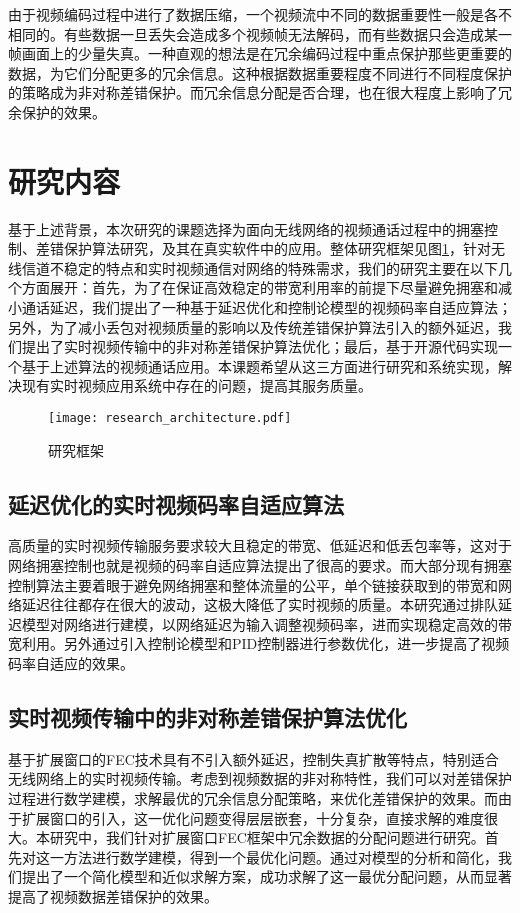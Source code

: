 由于视频编码过程中进行了数据压缩，一个视频流中不同的数据重要性一般是各不相同的。有些数据一旦丢失会造成多个视频帧无法解码，而有些数据只会造成某一帧画面上的少量失真。一种直观的想法是在冗余编码过程中重点保护那些更重要的数据，为它们分配更多的冗余信息。这种根据数据重要程度不同进行不同程度保护的策略成为非对称差错保护。而冗余信息分配是否合理，也在很大程度上影响了冗余保护的效果。


\section{研究内容}
基于上述背景，本次研究的课题选择为面向无线网络的视频通话过程中的拥塞控制、差错保护算法研究，及其在真实软件中的应用。整体研究框架见图\ref{fig:research_architecture}，针对无线信道不稳定的特点和实时视频通信对网络的特殊需求，我们的研究主要在以下几个方面展开：首先，为了在保证高效稳定的带宽利用率的前提下尽量避免拥塞和减小通话延迟，我们提出了一种基于延迟优化和控制论模型的视频码率自适应算法；另外，为了减小丢包对视频质量的影响以及传统差错保护算法引入的额外延迟，我们提出了实时视频传输中的非对称差错保护算法优化；最后，基于开源代码实现一个基于上述算法的视频通话应用。本课题希望从这三方面进行研究和系统实现，解决现有实时视频应用系统中存在的问题，提高其服务质量。

\begin{figure}[htbp]
  \centering
  \texttt{[image: research\_architecture.pdf]}
  \caption{研究框架}
  \label{fig:research_architecture}
\end{figure}


\subsection{延迟优化的实时视频码率自适应算法}
高质量的实时视频传输服务要求较大且稳定的带宽、低延迟和低丢包率等，这对于网络拥塞控制也就是视频的码率自适应算法提出了很高的要求。而大部分现有拥塞控制算法主要着眼于避免网络拥塞和整体流量的公平，单个链接获取到的带宽和网络延迟往往都存在很大的波动，这极大降低了实时视频的质量。本研究通过排队延迟模型对网络进行建模，以网络延迟为输入调整视频码率，进而实现稳定高效的带宽利用。另外通过引入控制论模型和PID控制器进行参数优化，进一步提高了视频码率自适应的效果。

\subsection{实时视频传输中的非对称差错保护算法优化}
基于扩展窗口的FEC技术具有不引入额外延迟，控制失真扩散等特点，特别适合无线网络上的实时视频传输。考虑到视频数据的非对称特性，我们可以对差错保护过程进行数学建模，求解最优的冗余信息分配策略，来优化差错保护的效果。而由于扩展窗口的引入，这一优化问题变得层层嵌套，十分复杂，直接求解的难度很大。本研究中，我们针对扩展窗口FEC框架中冗余数据的分配问题进行研究。首先对这一方法进行数学建模，得到一个最优化问题。通过对模型的分析和简化，我们提出了一个简化模型和近似求解方案，成功求解了这一最优分配问题，从而显著提高了视频数据差错保护的效果。

